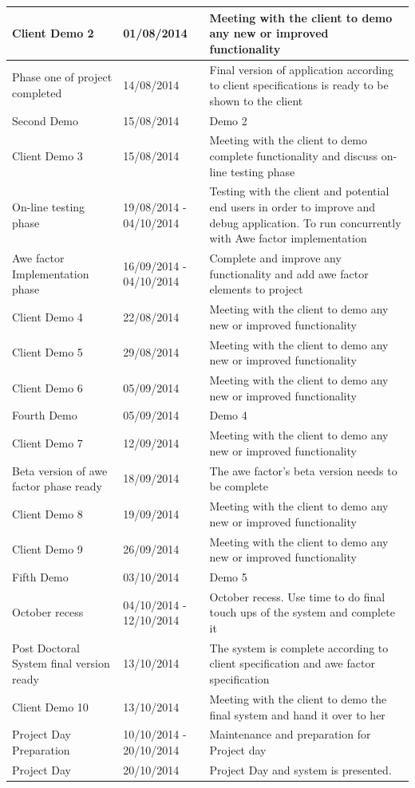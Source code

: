 \documentclass[12pt]{article}
\begin{document}
\begin{center}
\begin{longtable}{|p{3cm}|p{3cm}|p{9cm}|}
\hline
Client Demo 2 & 01/08/2014 & Meeting with the client to demo any new or improved functionality \\
\hline
Phase one of project completed & 14/08/2014 & Final version of application according to client specifications is ready to be shown to the client  \\
\hline
Second Demo & 15/08/2014 & Demo 2 \\
\hline
Client Demo 3 & 15/08/2014 & Meeting with the client to demo complete functionality and discuss on-line testing phase  \\
\hline
On-line testing phase & 19/08/2014 - 04/10/2014 & Testing with the client and potential end users in order to improve and debug application. To run concurrently with Awe factor implementation\\
\hline
Awe factor Implementation phase & 16/09/2014 - 04/10/2014 & Complete and improve any functionality and add awe factor elements to project\\
\hline
Client Demo 4 & 22/08/2014 & Meeting with the client to demo any new or improved functionality  \\
\hline
Client Demo 5 & 29/08/2014 & Meeting with the client to demo any new or improved functionality \\
\hline
Client Demo 6 & 05/09/2014 & Meeting with the client to demo any new or improved functionality\\
\hline
Fourth Demo & 05/09/2014 & Demo 4 \\
\hline
Client Demo 7 & 12/09/2014 & Meeting with the client to demo any new or improved functionality\\
\hline
Beta version of awe factor phase ready & 18/09/2014 & The awe factor's beta version needs to be complete\\
\hline
Client Demo 8 & 19/09/2014 & Meeting with the client to demo any new or improved functionality\\
\hline
Client Demo 9 & 26/09/2014 & Meeting with the client to demo any new or improved functionality\\
\hline
Fifth Demo & 03/10/2014 & Demo 5 \\
\hline
October recess & 04/10/2014 - 12/10/2014 & October recess. Use time to do final touch ups of the system and complete it\\
\hline
Post Doctoral System final version ready & 13/10/2014 & The system is complete according to client specification and awe factor specification \\
\hline
Client Demo 10 & 13/10/2014 & Meeting with the client to demo the final system and hand it over to her\\
\hline
Project Day Preparation & 10/10/2014 - 20/10/2014 & Maintenance and preparation for Project day  \\
\hline
Project Day & 20/10/2014 & Project Day and system is presented. \\
\hline


\end{longtable}
\end{center}
\end{document}
